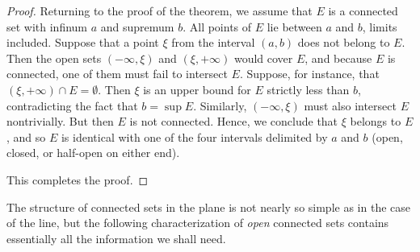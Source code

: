 \begin{proof}
	Returning to the proof of the theorem, we assume that $E$ is a connected set with infinum $a$ and supremum $b$. All points of $E$ lie between $a$ and $b$, limits included. Suppose that a point $\xi$ from the interval $(a,b)$ does not belong to $E$. Then the open sets $(-\infty, \xi)$ and $(\xi, +\infty)$ would cover $E$, and because $E$ is connected, one of them must fail to intersect $E$. Suppose, for instance, that $(\xi, +\infty) \cap E=\emptyset$. Then $\xi$ is an upper bound for $E$ strictly less than $b$, contradicting the fact that $b=\sup E$. Similarly, $(-\infty,\xi)$ must also intersect $E$ nontrivially. But then $E$ is not connected. Hence, we conclude that $\xi$ belongs to $E$, and so $E$ is identical with one of the four intervals delimited by $a$ and $b$ (open, closed, or half-open on either end).
	
	This completes the proof.
\end{proof}

The structure of connected sets in the plane is not nearly so simple as in the case of the line, but the following characterization of \emph{open} connected sets contains essentially all the information we shall need.

